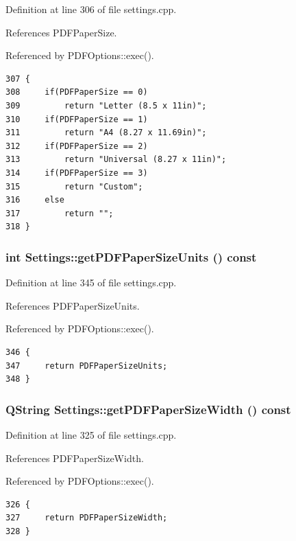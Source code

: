 Definition at line 306 of file settings.cpp.

References PDFPaper\-Size.

Referenced by PDFOptions::exec().

\footnotesize\begin{verbatim}307 {
308     if(PDFPaperSize == 0)
309         return "Letter (8.5 x 11in)";
310     if(PDFPaperSize == 1)
311         return "A4 (8.27 x 11.69in)";
312     if(PDFPaperSize == 2)
313         return "Universal (8.27 x 11in)";
314     if(PDFPaperSize == 3)
315         return "Custom";
316     else
317         return "";
318 }
\end{verbatim}\normalsize 


\hypertarget{classSettings_a44}{
\subsubsection[getPDFPaperSizeUnits]{\setlength{\rightskip}{0pt plus 5cm}int Settings::get\-PDFPaper\-Size\-Units () const}}
\label{classSettings_a44}


Definition at line 345 of file settings.cpp.

References PDFPaper\-Size\-Units.

Referenced by PDFOptions::exec().

\footnotesize\begin{verbatim}346 {
347     return PDFPaperSizeUnits;
348 }
\end{verbatim}\normalsize 


\hypertarget{classSettings_a40}{
\subsubsection[getPDFPaperSizeWidth]{\setlength{\rightskip}{0pt plus 5cm}QString Settings::get\-PDFPaper\-Size\-Width () const}}
\label{classSettings_a40}


Definition at line 325 of file settings.cpp.

References PDFPaper\-Size\-Width.

Referenced by PDFOptions::exec().

\footnotesize\begin{verbatim}326 {
327     return PDFPaperSizeWidth;
328 }
\end{verbatim}\normalsize 


